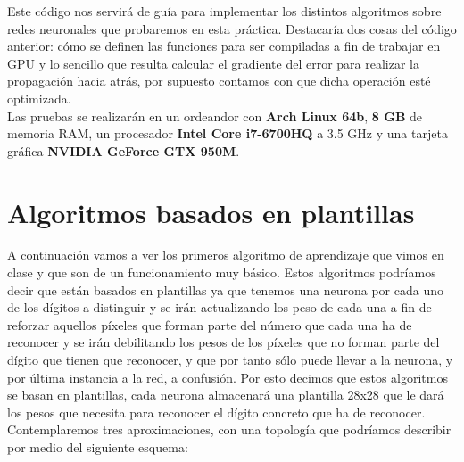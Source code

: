 \documentclass[10pt,a4paper]{article}
\begin{document}
Este código nos servirá de guía para implementar los distintos algoritmos sobre redes neuronales que probaremos en esta práctica. Destacaría dos cosas del código anterior: cómo se definen las funciones para ser compiladas a fin de trabajar en GPU y lo sencillo que resulta calcular el gradiente del error para realizar la propagación hacia atrás, por supuesto contamos con que dicha operación esté optimizada.\\

Las pruebas se realizarán en un ordeandor con \textbf{Arch Linux 64b}, \textbf{8 GB} de memoria RAM, un procesador \textbf{Intel Core i7-6700HQ} a 3.5 GHz y una tarjeta gráfica \textbf{NVIDIA GeForce GTX 950M}.

\section{Algoritmos basados en plantillas}

A continuación vamos a ver los primeros algoritmo de aprendizaje que vimos en clase y que son de un funcionamiento muy básico. Estos algoritmos podríamos decir que están basados en plantillas ya que tenemos una neurona por cada uno de los dígitos a distinguir y se irán actualizando los peso de cada una a fin de reforzar aquellos píxeles que forman parte del número que cada una ha de reconocer y se irán debilitando los pesos de los píxeles que no forman parte del dígito que tienen que reconocer, y que por tanto sólo puede llevar a la neurona, y por última instancia a la red, a confusión. Por esto decimos que estos algoritmos se basan en plantillas, cada neurona almacenará una plantilla 28x28 que le dará los pesos que necesita para reconocer el dígito concreto que ha de reconocer. Contemplaremos tres aproximaciones, con una topología que podríamos describir por medio del siguiente esquema:
\end{document}
